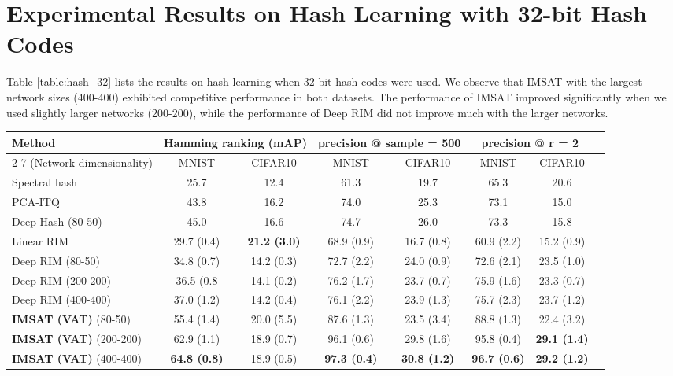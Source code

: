 \documentclass{article}
\theoremstyle{plain}
\begin{document}
\section{Experimental Results on Hash Learning with 32-bit Hash Codes} \label{app:exp_hash32}
Table \ref{table:hash_32} lists the results on hash learning when 32-bit hash codes were used.
We observe that IMSAT with the largest network sizes (400-400) exhibited competitive performance in both datasets. The performance of IMSAT improved significantly when we used slightly larger networks (200-200), while the performance of Deep RIM did not improve much with the larger networks.
\begin{table*}[t] 
\begin{center}
\caption{Comparison of hash performance for 32-bit hash codes (\%). Averages and standard deviations over ten trials were reported. Experimental results of Deep Hash and the previous methods are excerpted from \citet{erin2015deep}.}
\begin{tabular}{|l||c|c|c|c|c|c|c|}\hline
Method & \multicolumn{2}{|c|}{Hamming ranking (mAP)} &\multicolumn{2}{|c|}{precision @ sample = 500} & \multicolumn{2}{|c|}{precision @ r = 2} \\ \cline{2-7}
(Network dimensionality)             & MNIST & CIFAR10 & MNIST & CIFAR10 & MNIST & CIFAR10 \\ \hline
Spectral hash \citep{weiss2009spectral}& 25.7  & 12.4  &61.3 & 19.7  &  65.3 & 20.6  \\ \hline
PCA-ITQ \citep{gong2013iterative} & 43.8   & 16.2  &  74.0  & 25.3  & 73.1  & 15.0  \\ \hline
Deep Hash (80-50)&45.0  & 16.6 & 74.7 &  26.0  & 73.3  & 15.8   \\  \hline
Linear RIM  &29.7 (0.4)   & {\bf 21.2 (3.0)} &   68.9 (0.9)   &  16.7 (0.8)  &  60.9 (2.2)  &  15.2 (0.9)  \\ \hline
Deep RIM (80-50) &34.8 (0.7)   & 14.2 (0.3) &  72.7 (2.2) & 24.0 (0.9)  &  72.6 (2.1) & 23.5 (1.0)   \\ \hline
Deep RIM (200-200) &36.5 (0.8  & 14.1 (0.2) &  76.2 (1.7) & 23.7 (0.7)  &  75.9 (1.6) & 23.3 (0.7)   \\ \hline
Deep RIM (400-400) &37.0 (1.2)  & 14.2 (0.4) & 76.1 (2.2) & 23.9 (1.3)  &  75.7 (2.3)& 23.7 (1.2)   \\ \hline
{\bf IMSAT (VAT)} (80-50)  & 55.4 (1.4) & 20.0 (5.5)  & 87.6 (1.3)& 23.5 (3.4)  & 88.8 (1.3)  & 22.4 (3.2)     \\ \hline
{\bf IMSAT (VAT)} (200-200)  & 62.9 (1.1)& 18.9 (0.7)  &  96.1 (0.6) & 29.8 (1.6)  &  95.8 (0.4)   & {\bf 29.1 (1.4)}     \\ \hline
{\bf IMSAT (VAT)} (400-400)  & {\bf 64.8 (0.8)} & 18.9 (0.5)  & {\bf 97.3 (0.4)} & {\bf 30.8 (1.2)}  &{\bf 96.7 (0.6)}   & {\bf 29.2 (1.2)}     \\ \hline
\end{tabular}
\label{table:hash_32}
\end{center}
\end{table*}
\end{document}
